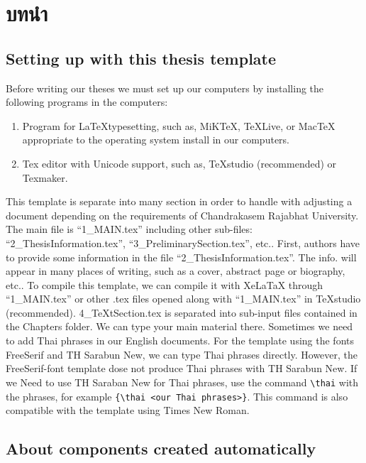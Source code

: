 \chapter{บทนำ}

\section{Setting up with this thesis template}

Before writing our theses we must set up our computers by installing the following programs in the computers:
\begin{enumerate}[\quad1)]
	\item Program for \LaTeX typesetting, such as, MiKTeX, TeXLive, or MacTeX appropriate to the operating system install in our computers.
	\item Tex editor with Unicode support, such as, TeXstudio (recommended) or Texmaker.
\end{enumerate}
This template is separate into many section in order to handle with adjusting a document depending on the requirements of Chandrakasem Rajabhat University. The main file is “1\_MAIN.tex” including other sub-files: “2\_ThesisInformation.tex”, “3\_PreliminarySection.tex”, etc.. First, authors have to provide some information in the file “2\_ThesisInformation.tex”. The info. will appear in many places of writing, such as a cover, abstract page or biography, etc.. To compile this template, we can compile it with XeLaTaX through “1\_MAIN.tex” or other .tex files opened along with “1\_MAIN.tex” in TeXstudio (recommended). 4\_TeXtSection.tex is separated into sub-input files contained in the Chapters folder. We can type your main material there.
Sometimes we need to add Thai phrases in our English documents. For the template using the fonts FreeSerif and TH Sarabun New, we can type Thai phrases directly. However, the FreeSerif-font template dose not produce Thai phrases with TH Sarabun New. If we Need to use TH Saraban New for Thai phrases, use the command \verb|\thai| with the phrases, for example \verb|{\thai <our Thai phrases>}|. This command is also compatible with the template using Times New Roman.




\section{About components created automatically}

